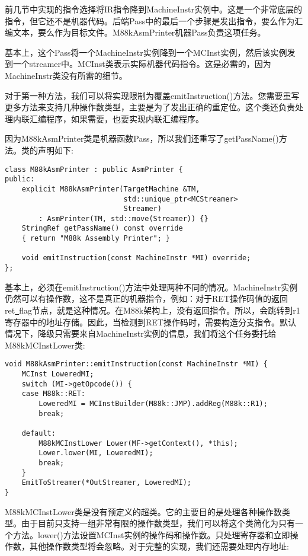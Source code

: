前几节中实现的指令选择将IR指令降到MachineInstr实例中。这是一个非常底层的指令，但它还不是机器代码。后端Pass中的最后一个步骤是发出指令，要么作为汇编文本，要么作为目标文件。M88kAsmPrinter机器Pass负责这项任务。\par

基本上，这个Pass将一个MachineInstr实例降到一个MCInst实例，然后该实例发到一个streamer中。MCInst类表示实际机器代码指令。这是必需的，因为MachineInstr类没有所需的细节。\par

对于第一种方法，我们可以将实现限制为覆盖emitInstruction()方法。您需要重写更多方法来支持几种操作数类型，主要是为了发出正确的重定位。这个类还负责处理内联汇编程序，如果需要，也要实现内联汇编程序。\par

因为M88kAsmPrinter类是机器函数Pass，所以我们还重写了getPassName()方法。类的声明如下:\par

\begin{lstlisting}[caption={}]
class M88kAsmPrinter : public AsmPrinter {
public:
	explicit M88kAsmPrinter(TargetMachine &TM,
							std::unique_ptr<MCStreamer>
							Streamer)
		: AsmPrinter(TM, std::move(Streamer)) {}
	StringRef getPassName() const override
	{ return "M88k Assembly Printer"; }
	
	void emitInstruction(const MachineInstr *MI) override;
};
\end{lstlisting}

基本上，必须在emitInstruction()方法中处理两种不同的情况。MachineInstr实例仍然可以有操作数，这不是真正的机器指令，例如：对于RET操作码值的返回ret\underline{~}flag节点，就是这种情况。在M88k架构上，没有返回指令。所以，会跳转到r1寄存器中的地址存储。因此，当检测到RET操作码时，需要构造分支指令。默认情况下，降级只需要来自MachineInstr实例的信息，我们将这个任务委托给M88kMCInstLower类:\par

\begin{lstlisting}[caption={}]
void M88kAsmPrinter::emitInstruction(const MachineInstr *MI) {
	MCInst LoweredMI;
	switch (MI->getOpcode()) {
	case M88k::RET:
		LoweredMI = MCInstBuilder(M88k::JMP).addReg(M88k::R1);
		break;
		
	default:
		M88kMCInstLower Lower(MF->getContext(), *this);
		Lower.lower(MI, LoweredMI);
		break;
	}
	EmitToStreamer(*OutStreamer, LoweredMI);
}
\end{lstlisting}

M88kMCInstLower类是没有预定义的超类。它的主要目的是处理各种操作数类型。由于目前只支持一组非常有限的操作数类型，我们可以将这个类简化为只有一个方法。lower()方法设置MCInst实例的操作码和操作数。只处理寄存器和立即操作数，其他操作数类型将会忽略。对于完整的实现，我们还需要处理内存地址:\par

